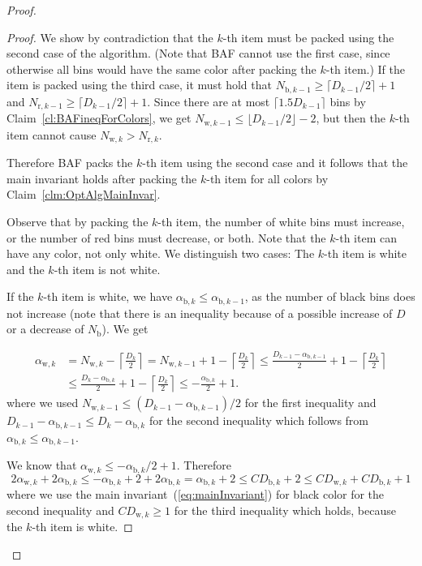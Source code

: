 \documentclass[11pt,a4paper]{article}
\def\vari#1{\mathit{#1}}
\begin{document}
\begin{proof}
\begin{proof}
We show by contradiction that the $k$-th item must be packed using the second case of the algorithm.
(Note that BAF cannot use the first case, since otherwise all bins would have the same color after
packing the $k$-th item.)
If the item is packed using the third case, it must hold that
$N_{\mathrm{b},k-1} \geq \lceil D_{k-1}/2\rceil +1$ and $N_{\mathrm{r},k-1}\geq \lceil D_{k-1}/2\rceil +1$.
Since there are at most $\lceil 1.5D_{k-1}\rceil$ bins by Claim~\ref{cl:BAFineqForColors},
we get $N_{\mathrm{w},k-1} \leq \lfloor D_{k-1}/2\rfloor -2$, but then the $k$-th item
cannot cause $N_{\mathrm{w},k} > N_{\mathrm{r},k}$.

Therefore BAF packs the $k$-th item using the second case
and it follows that the main invariant holds after packing the $k$-th item for all colors
by Claim~\ref{clm:OptAlgMainInvar}.

Observe that by packing the $k$-th item, the number of white bins must increase,
or the number of red bins must decrease, or both.
Note that the $k$-th item can have any color, not only white. 
We distinguish two cases: The $k$-th item is white
and the $k$-th item is not white.

If the $k$-th item is white,
we have $\alpha_{\mathrm{b},k} \leq \alpha_{\mathrm{b},k-1}$, as the number of black bins does not increase
(note that there is an inequality because of a possible increase of $D$ or a decrease of $N_{\mathrm{b}}$).
We get

\begin{align*}
\alpha_{\mathrm{w},k} &= N_{\mathrm{w},k} - \left\lceil\frac{D_{k}}{2}\right\rceil
= N_{\mathrm{w},k-1} + 1 - \left\lceil\frac{D_{k}}{2}\right\rceil
\leq \frac{D_{k-1} - \alpha_{\mathrm{b},k-1}}{2} + 1 - \left\lceil\frac{D_{k}}{2}\right\rceil \\
&\leq \frac{D_{k} - \alpha_{\mathrm{b},k}}{2} + 1 - \left\lceil\frac{D_{k}}{2}\right\rceil
\leq -\frac{\alpha_{\mathrm{b},k}}{2} + 1.
\end{align*}
where we used $N_{\mathrm{w},k-1} \leq (D_{k-1} - \alpha_{\mathrm{b},k-1})/2$ for the first inequality and
$D_{k-1} - \alpha_{\mathrm{b},k-1} \leq D_{k} - \alpha_{\mathrm{b},k}$ for the second inequality
which follows from $\alpha_{\mathrm{b},k} \leq \alpha_{\mathrm{b},k-1}$.

We know that
$\alpha_{\mathrm{w},k}\leq -\alpha_{\mathrm{b},k}/2 + 1$.
Therefore
$$2\alpha_{\mathrm{w},k}+2\alpha_{\mathrm{b},k}
\leq -\alpha_{\mathrm{b},k} + 2 + 2\alpha_{\mathrm{b},k}
= \alpha_{\mathrm{b},k} + 2 \leq \vari{CD}_{\mathrm{b},k} + 2
\leq \vari{CD}_{\mathrm{w},k} + \vari{CD}_{\mathrm{b},k} + 1
$$
where we use the main invariant~(\ref{eq:mainInvariant}) for black color for the second inequality
and $\vari{CD}_{\mathrm{w},k} \geq 1$ for the third inequality which holds, because the $k$-th item is white.


\end{proof}
\end{proof}
\end{document}
